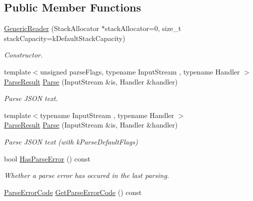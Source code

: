 \subsection*{Public Member Functions}
\begin{DoxyCompactItemize}
\item 
\hyperlink{class_generic_reader_aab875a34b3092df9fb4e2b8eac6dbb96}{Generic\+Reader} (Stack\+Allocator $\ast$stack\+Allocator=0, size\+\_\+t stack\+Capacity=k\+Default\+Stack\+Capacity)
\begin{DoxyCompactList}\small\item\em Constructor. \end{DoxyCompactList}\item 
{\footnotesize template$<$unsigned parse\+Flags, typename Input\+Stream , typename Handler $>$ }\\\hyperlink{struct_parse_result}{Parse\+Result} \hyperlink{class_generic_reader_a0c450620d14ff1824e58bb7bd9b42099}{Parse} (Input\+Stream \&is, Handler \&handler)
\begin{DoxyCompactList}\small\item\em Parse J\+S\+ON text. \end{DoxyCompactList}\item 
{\footnotesize template$<$typename Input\+Stream , typename Handler $>$ }\\\hyperlink{struct_parse_result}{Parse\+Result} \hyperlink{class_generic_reader_a76d91e5fd8dfe48aea7dd6d8a51dd6dc}{Parse} (Input\+Stream \&is, Handler \&handler)
\begin{DoxyCompactList}\small\item\em Parse J\+S\+ON text (with k\+Parse\+Default\+Flags) \end{DoxyCompactList}\item 
bool \hyperlink{class_generic_reader_aa9d10652062557ebf26cf414bfeabf84}{Has\+Parse\+Error} () const \hypertarget{class_generic_reader_aa9d10652062557ebf26cf414bfeabf84}{}\label{class_generic_reader_aa9d10652062557ebf26cf414bfeabf84}

\begin{DoxyCompactList}\small\item\em Whether a parse error has occured in the last parsing. \end{DoxyCompactList}\item 
\hyperlink{group___r_a_p_i_d_j_s_o_n___e_r_r_o_r_s_ga8d4b32dfc45840bca189ade2bbcb6ba7}{Parse\+Error\+Code} \hyperlink{class_generic_reader_ac45a26246877c4daa85021ae67caa017}{Get\+Parse\+Error\+Code} () const \hypertarget{class_generic_reader_ac45a26246877c4daa85021ae67caa017}{}\label{class_generic_reader_ac45a26246877c4daa85021ae67caa017}


\end{DoxyCompactItemize}

